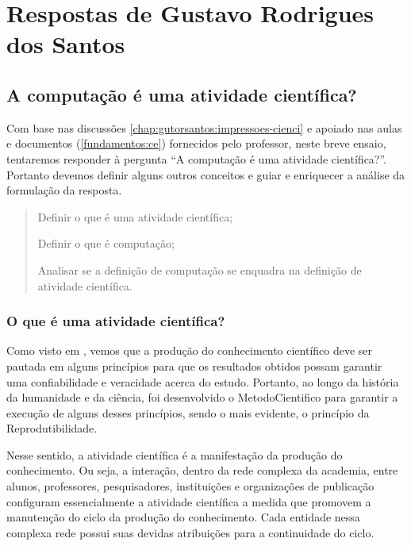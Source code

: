 \section{Respostas de Gustavo Rodrigues dos Santos\label{tarefa-gutorsantos-tarefa-5-1}}

\subsection{A computação é uma atividade científica?}

Com base nas discussões \ref{chap:gutorsantos:impressoes-cienci} e apoiado nas aulas e documentos (\ref{fundamentos:ce}) fornecidos pelo professor, neste breve ensaio, tentaremos responder à pergunta ``A computação é uma atividade científica?''. Portanto devemos definir alguns outros conceitos e guiar e enriquecer a análise da formulação da resposta.

\begin{quote}
Definir o que é uma atividade científica;

Definir o que é computação;

Analisar se a definição de computação se enquadra na definição de atividade científica. 
\end{quote}

\subsubsection{O que é uma atividade científica?} 

Como visto em \cite{fernandes_consideracoes_2021}, vemos que a produção do conhecimento científico deve ser pautada em alguns princípios para que os resultados obtidos possam garantir uma confiabilidade e veracidade acerca do estudo. Portanto, ao longo da história da humanidade e da ciência, foi desenvolvido o \gls{MetodoCientifico} para garantir a execução de alguns desses princípios, sendo o mais evidente, o princípio da Reprodutibilidade.

Nesse sentido, a atividade científica é a manifestação da produção do conhecimento. Ou seja, a interação, dentro da rede complexa da academia, entre alunos, professores, pesquisadores, instituições e organizações de publicação configuram essencialmente a atividade científica a medida que promovem a manutenção do ciclo da produção do conhecimento. Cada entidade nessa complexa rede possui suas devidas atribuições para a continuidade do ciclo. 

